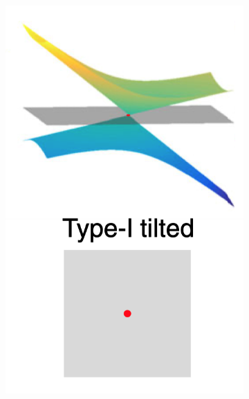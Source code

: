 \begin{figure}[H]
\begin{subfigure}[b]{0.2\linewidth}
            \includegraphics[width = \linewidth]{fig/Chap 2/Type I tilted.png}
            \caption{}
            \label{2fig:type1 tilted}
        \end{subfigure}
        \begin{subfigure}[b]{0.2\linewidth}

\end{subfigure}
\end{figure}
